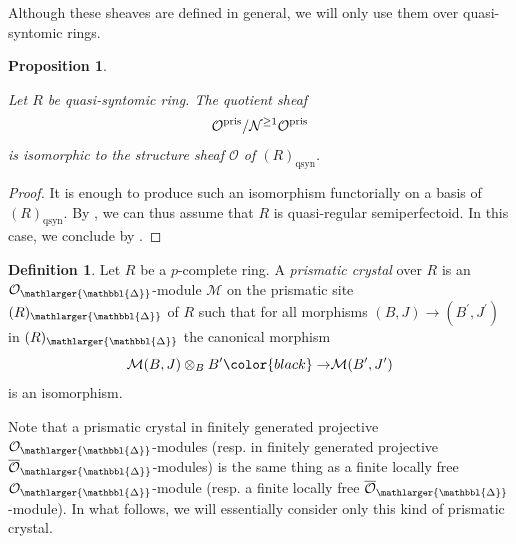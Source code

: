 \documentclass{amsart}
\newcommand{\prism}{{\mathlarger{\mathbbl{\Delta}}}}
\theoremstyle{plain}
\newtheorem{proposition}[theorem]{Proposition}
\theoremstyle{definition}
\newtheorem{definition}[theorem]{Definition}
\newcommand{\red}[1]{{\color{black} #1}}
\begin{document}
Although these sheaves are defined in general, we will only use them over quasi-syntomic rings. 

\begin{proposition}
 \label{sec:abstr-divid-prism-proposition-quotient-sheaf-is-structure-sheaf}

Let $R$ be quasi-syntomic ring. The quotient sheaf $$\mathcal{O}^{\rm pris} / \mathcal{N}^{\geq 1} \mathcal{O}^{\rm pris}$$ is isomorphic to the structure sheaf $\mathcal{O}$ of $(R)_{\mathrm{qsyn}}$. 
\end{proposition}
\begin{proof}
It is enough to produce such an isomorphism functorially on a basis of $(R)_{\mathrm{qsyn}}$. By , we can thus assume that $R$ is quasi-regular semiperfectoid. In this case, we conclude by .
\end{proof} 

\begin{definition}
  \label{sec:prism-dieud-cryst-definition-prismatic-crystals}
  Let $R$ be a $p$-complete ring. A \textit{prismatic crystal} over $R$ is an $\mathcal{O}_\prism$-module $\mathcal{M}$ on the prismatic site $(R)_\prism$ of $R$ such that for all morphisms $(B,J)\to (B^\prime,J^\prime)$ in $(R)_\prism$ the canonical morphism
  $$
  \mathcal{M}(B,J)\otimes_{B}B^\prime\red{\to} \mathcal{M}(B^\prime,J^\prime)
  $$
  is an isomorphism.
\end{definition}

Note that a prismatic crystal in finitely generated projective $\mathcal{O}_\prism$-modules (resp. in finitely generated projective $\overline{\mathcal{O}}_{\prism}$-modules) is the same thing as a finite locally free $\mathcal{O}_{\prism}$-module (resp. a finite locally free $\overline{\mathcal{O}}_{\prism}$-module). In what follows, we will essentially consider only this kind of prismatic crystal.
\end{document}
